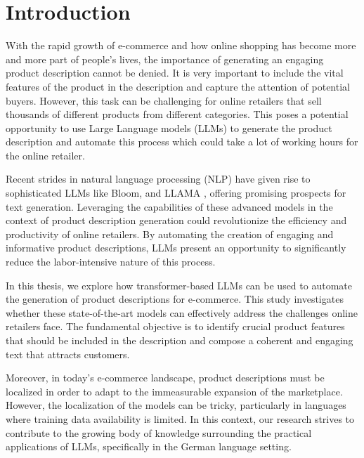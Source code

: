 \chapter{Introduction}\label{chap:introduction}



With the rapid growth of e-commerce and how online shopping has become more and more part of people's lives, the importance of generating an engaging product description cannot be denied. It is very important to include the vital features of the product in the description and capture the attention of potential buyers. However, this task can be challenging for online retailers that sell thousands of different products from different categories. This poses a potential opportunity to use Large Language models (LLMs) to generate the product description and automate this process which could take a lot of working hours for the online retailer. 

Recent strides in natural language processing (NLP) have given rise to sophisticated LLMs like Bloom\cite{workshop2023bloom}, and LLAMA \cite{touvron2023llama}, offering promising prospects for text generation. Leveraging the capabilities of these advanced models in the context of product description generation could revolutionize the efficiency and productivity of online retailers. By automating the creation of engaging and informative product descriptions, LLMs present an opportunity to significantly reduce the labor-intensive nature of this process.

In this thesis, we explore how transformer-based LLMs can be used to automate the generation of product descriptions for e-commerce. This study investigates whether these state-of-the-art models can effectively address the challenges online retailers face. The fundamental objective is to identify crucial product features that should be included in the description and compose a coherent and engaging text that attracts customers.

Moreover, in today's e-commerce landscape, product descriptions must be localized in order to adapt to the immeasurable expansion of the marketplace. However, the localization of the models can be tricky, particularly in languages where training data availability is limited. In this context, our research strives to contribute to the growing body of knowledge surrounding the practical applications of LLMs, specifically in the German language setting.

